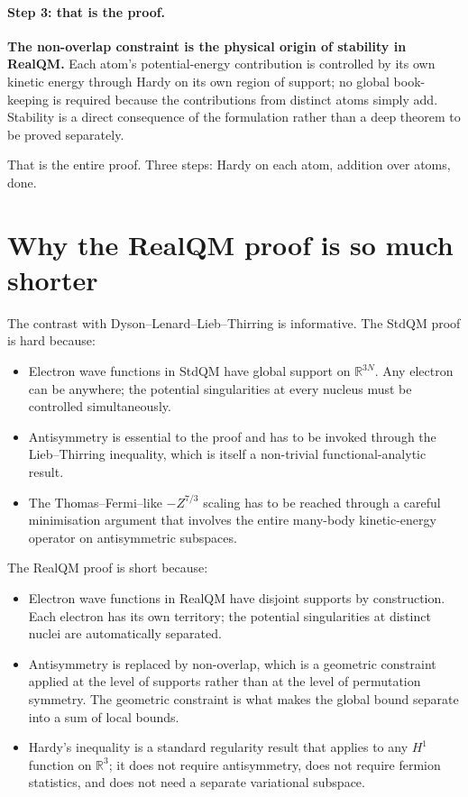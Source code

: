 \paragraph{Step 3: that is the proof.}
\textbf{The non-overlap constraint is the physical origin of stability in RealQM.} Each atom's potential-energy contribution is controlled by its own kinetic energy through Hardy on its own region of support; no global book-keeping is required because the contributions from distinct atoms simply add. Stability is a direct consequence of the formulation rather than a deep theorem to be proved separately.

That is the entire proof. Three steps: Hardy on each atom, addition over atoms, done.

\section{Why the RealQM proof is so much shorter}\label{sec:why-shorter}

The contrast with Dyson--Lenard--Lieb--Thirring is informative. The StdQM proof is hard because:
\begin{itemize}
\item Electron wave functions in StdQM have global support on $\mathbb{R}^{3N}$. Any electron can be anywhere; the potential singularities at every nucleus must be controlled simultaneously.
\item Antisymmetry is essential to the proof and has to be invoked through the Lieb--Thirring inequality, which is itself a non-trivial functional-analytic result.
\item The Thomas--Fermi--like $-Z^{7/3}$ scaling has to be reached through a careful minimisation argument that involves the entire many-body kinetic-energy operator on antisymmetric subspaces.
\end{itemize}
The RealQM proof is short because:
\begin{itemize}
\item Electron wave functions in RealQM have disjoint supports by construction. Each electron has its own territory; the potential singularities at distinct nuclei are automatically separated.
\item Antisymmetry is replaced by non-overlap, which is a geometric constraint applied at the level of supports rather than at the level of permutation symmetry. The geometric constraint is what makes the global bound separate into a sum of local bounds.
\item Hardy's inequality is a standard regularity result that applies to any $H^1$ function on $\mathbb{R}^3$; it does not require antisymmetry, does not require fermion statistics, and does not need a separate variational subspace.
\end{itemize}

